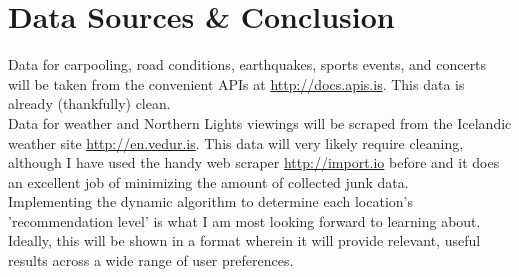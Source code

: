 \documentclass[9pt]{article}
\begin{document}
\section{Data Sources \& Conclusion}
Data for carpooling, road conditions, earthquakes, sports events, and concerts will be taken from the convenient APIs at \url{http://docs.apis.is}. This data is already (thankfully) clean.\\

\noindent{}Data for weather and Northern Lights viewings will be scraped from the Icelandic weather site \url{http://en.vedur.is}. This data will very likely require cleaning, although I have used the handy web scraper \url{http://import.io} before and it does an excellent job of minimizing the amount of collected junk data.\\

Implementing the dynamic algorithm to determine each location's 'recommendation level' is what I am most looking forward to learning about. Ideally, this will be shown in a format wherein it will provide relevant, useful results across a wide range of user preferences.
\end{document}
